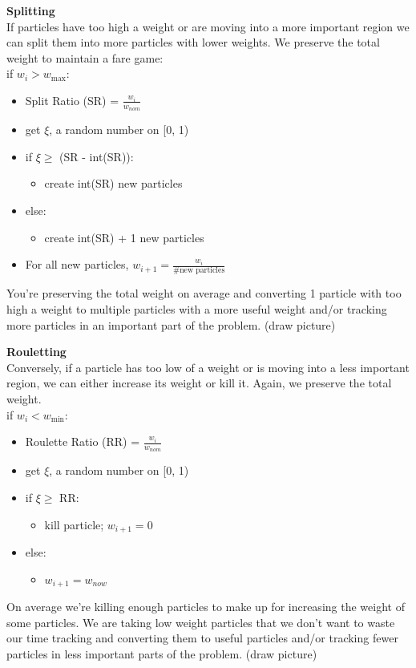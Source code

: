 \documentclass[12pt]{article}
\begin{document}
\textbf{Splitting}\\
If particles have too high a weight or are moving into a more important region we can split them into more particles with lower weights. We preserve the total weight to maintain a fare game:\\
\noindent\makebox[\linewidth]{\rule{\textwidth}{0.4pt}}
if $w_i > w_{\max}$:
\begin{itemize}
\item Split Ratio (SR) = $\frac{w_i}{w_{nom}}$
\item get $\xi$, a random number on [0, 1)
\item if $\xi \geq$ (SR - int(SR)):
  \begin{itemize}
  \item create int(SR) new particles
  \end{itemize}
\item else:
  \begin{itemize}
  \item create int(SR) + 1 new particles
  \end{itemize}
\item For all new particles, $w_{i+1} = \frac{w_i}{\# \text{new particles}}$
\end{itemize}
\noindent\makebox[\linewidth]{\rule{\textwidth}{0.4pt}}
%
You're preserving the total weight on average and converting 1 particle with too high a weight to multiple particles with a more useful weight and/or tracking more particles in an important part of the problem. (draw picture)

\textbf{Rouletting}\\
Conversely, if a particle has too low of a weight or is moving into a less important region, we can either increase its weight or kill it. Again, we preserve the total weight.\\
\noindent\makebox[\linewidth]{\rule{\textwidth}{0.4pt}}
if $w_i < w_{\min}$:
\begin{itemize}
\item Roulette Ratio (RR) = $\frac{w_i}{w_{nom}}$
\item get $\xi$, a random number on [0, 1)
\item if $\xi \geq$ RR:
  \begin{itemize}
  \item kill particle; $w_{i+1} = 0$
  \end{itemize}
\item else:
  \begin{itemize}
  \item $w_{i+1} = w_{now}$
  \end{itemize}
\end{itemize}
\noindent\makebox[\linewidth]{\rule{\textwidth}{0.4pt}}
%
On average we're killing enough particles to make up for increasing the weight of some particles. We are taking low weight particles that we don't want to waste our time tracking and converting them to useful particles and/or tracking fewer particles in less important parts of the problem. (draw picture)
\end{document}
